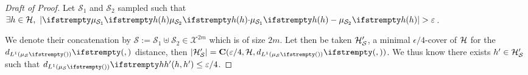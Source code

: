 \begin{proof}[Draft of Proof]
	Let $\mathcal{S}_1$ and $\mathcal{S}_2$ sampled such that $\exists \threequery \in \threeqset,\ \dnude{\nu}{\empdistr{\mathcal{S}_1}{\threequery}}{\empdistr{\mathcal{S}_2}{\threequery}} > \epsilon$. 
	
	We denote their concatenation by $\mathcal{S} := \mathcal{S}_1 \uplus \mathcal{S}_2 \in \mathcal{X}^{2m}$ which is of size $2m$. Let then be taken $\mathcal{H}'_{\mathcal{S}}$, a minimal $\epsilon/4$-cover of $\mathcal{H}$ for the $\dlone{\empdistr{\mathcal{S}}{}}{}{}$ distance, then $|\threeqset'_{\mathcal{S}}| = \covering(\epsilon/4, \threeqset, \dlone{\empdistr{\mathcal{S}}{}}{}{})$. We thus know there exists $h' \in \mathcal{H}'_{\mathcal{S}}$ such that $\dlone{\empdistr{\mathcal{S}}{}}{\threequery}{\threequery'} \leq \epsilon/4$.



\end{proof}
